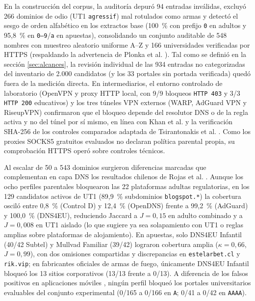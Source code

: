 \documentclass[10pt,a4paper]{article}
\begin{document}
En la construcción del corpus, la auditoría depuró 94 entradas inválidas, excluyó 266 dominios de odio (UT1 \texttt{agressif}) mal rotulados como armas y detectó el sesgo de orden alfabético en los extractos base (100~\% con prefijo \texttt{0} en adultos y 95,8~\% en \texttt{0--9}/\texttt{a} en apuestas), consolidando un conjunto auditable de 548 nombres con muestreo aleatorio uniforme A--Z y 166 universidades verificadas por HTTPS (respaldando la advertencia de Plonka et al. \cite{plonka2025}). Tal como se definió en la sección \ref{sec:alcances}, la revisión individual de las 934 entradas no categorizadas del inventario de 2.000 candidatos (y los 33 portales sin portada verificada) quedó fuera de la medición directa. En intermediarios, el entorno controlado de laboratorio (OpenVPN y proxy HTTP local, con 9/9 bloqueos \texttt{HTTP 403} y 3/3 \texttt{HTTP 200} educativos) y los tres túneles VPN externos (WARP, AdGuard VPN y RiseupVPN) confirmaron que el bloqueo depende del resolutor DNS o de la regla activa y no del túnel por sí mismo, en línea con Khan et al. \cite{khan2018vpn} y la verificación SHA-256 de los controles comparados adaptada de Tsirantonakis et al. \cite{tsirantonakis2018proxy}. Como los proxies SOCKS5 gratuitos evaluados no declaran política parental propia, su comprobación HTTPS operó sobre controles técnicos.

Al escalar de 50 a 543 dominios surgieron diferencias marcadas que complementan en capa DNS los resultados chilenos de Rojas et al. \cite{rojas2025,rojas2025ieee}. Aunque los ocho perfiles parentales bloquearon las 22 plataformas adultas regulatorias, en los 129 candidatos activos de UT1 (89,9~\% subdominios \texttt{blogspot.*}) la cobertura osciló entre 0,8~\% (Control D) y 12,4~\% (OpenDNS) frente a 99,2~\% (AdGuard) y 100,0~\% (DNS4EU), reduciendo Jaccard a $J = 0{,}15$ en adulto combinado y a $J = 0{,}008$ en UT1 aislado (lo que sugiere ya sea solapamiento con UT1 o reglas amplias sobre plataformas de alojamiento). En apuestas, solo DNS4EU Infantil (40/42 Subtel) y Mullvad Familiar (39/42) lograron cobertura amplia ($\kappa = 0{,}66$, $J = 0{,}99$), con dos omisiones compartidas y discrepancias en \texttt{estelarbet.cl} y \texttt{rik.vip}; en fabricantes oficiales de armas de fuego, únicamente DNS4EU Infantil bloqueó los 13 sitios corporativos (13/13 frente a 0/13). A diferencia de los falsos positivos en aplicaciones móviles \cite{rojas2025ieee}, ningún perfil bloqueó los portales universitarios evaluables del conjunto experimental (0/165 a 0/166 en \texttt{A}; 0/41 a 0/42 en \texttt{AAAA}).
\end{document}
